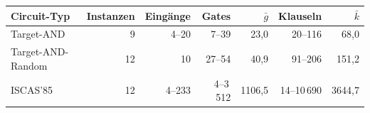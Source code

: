 \begin{tabular}{lrrrrrr}
\toprule
Circuit-Typ & Instanzen & Eingänge & Gates & $\bar{g}$ & Klauseln & $\bar{k}$ \\
\midrule
Target-AND & 9 & 4--20 & 7--39 & 23,0 & 20--116 & 68,0 \\
Target-AND-Random & 12 & 10 & 27--54 & 40,9 & 91--206 & 151,2 \\
ISCAS'85 & 12 & 4--233 & 4--3\,512 & 1106,5 & 14--10\,690 & 3644,7 \\
\bottomrule
\end{tabular}
